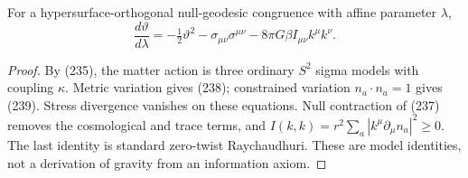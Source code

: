 \documentclass[11pt,a4paper,oneside]{book}
\begin{document}
For a hypersurface-orthogonal null-geodesic congruence with affine parameter $\lambda$,
\begin{equation}\frac{d\vartheta}{d\lambda}=-\tfrac12\vartheta^2-\sigma_{\mu\nu}\sigma^{\mu\nu}-8\pi G\beta I_{\mu\nu}k^\mu k^\nu.\tag{241}\end{equation}
\begin{proof}
By (235), the matter action is three ordinary $S^2$ sigma models with coupling $\kappa$. Metric variation gives (238); constrained variation $n_a\cdot n_a=1$ gives (239). Stress divergence vanishes on these equations. Null contraction of (237) removes the cosmological and trace terms, and $I(k,k)=r^2\sum_a|k^\mu\partial_\mu n_a|^2\ge0$. The last identity is standard zero-twist Raychaudhuri. These are model identities, not a derivation of gravity from an information axiom.
\end{proof}
\end{document}
